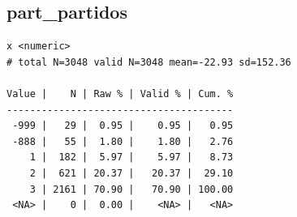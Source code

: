 \documentclass[
  letterpaper,
  DIV=11,
  numbers=noendperiod]{scrreprt}
\newenvironment{Shaded}{\begin{snugshade}}{\end{snugshade}}
\newcommand{\AttributeTok}[1]{\textcolor[rgb]{0.40,0.45,0.13}{#1}}
\newcommand{\CommentTok}[1]{\textcolor[rgb]{0.37,0.37,0.37}{#1}}
\newcommand{\DecValTok}[1]{\textcolor[rgb]{0.68,0.00,0.00}{#1}}
\newcommand{\FunctionTok}[1]{\textcolor[rgb]{0.28,0.35,0.67}{#1}}
\newcommand{\NormalTok}[1]{\textcolor[rgb]{0.00,0.23,0.31}{#1}}
\newcommand{\OtherTok}[1]{\textcolor[rgb]{0.00,0.23,0.31}{#1}}
\newcommand{\SpecialCharTok}[1]{\textcolor[rgb]{0.37,0.37,0.37}{#1}}
\begin{document}
\hypertarget{part_partidos}{%
\subsection{part\_partidos}\label{part_partidos}}

\begin{Shaded}
\end{Shaded}

\begin{verbatim}
x <numeric> 
# total N=3048 valid N=3048 mean=-22.93 sd=152.36

Value |    N | Raw % | Valid % | Cum. %
---------------------------------------
 -999 |   29 |  0.95 |    0.95 |   0.95
 -888 |   55 |  1.80 |    1.80 |   2.76
    1 |  182 |  5.97 |    5.97 |   8.73
    2 |  621 | 20.37 |   20.37 |  29.10
    3 | 2161 | 70.90 |   70.90 | 100.00
 <NA> |    0 |  0.00 |    <NA> |   <NA>
\end{verbatim}

\begin{Shaded}
\end{Shaded}
\end{document}
